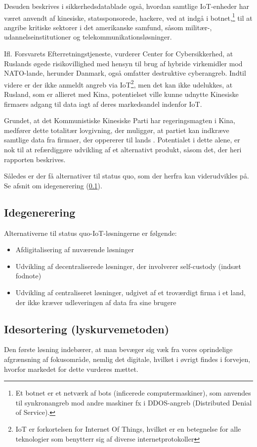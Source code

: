 \documentclass[11pt]{article}
\begin{document}
Desuden beskrives i sikkerhedsdatablade også, hvordan samtlige IoT-enheder har været anvendt af kinesiske, statssponsorede, hackere, ved at indgå i botnet,\footnote{Et botnet er et netværk af bots (inficerede computermaskiner), som anvendes til synkronangreb mod andre maskiner fx i DDOS-angreb (Distributed Denial of Service).} til at angribe kritiske sektorer i det amerikanske samfund, såsom militær-, udannelseinstitutioner og telekommunikationsløsninger. 

Ifl. Forsvarets Efterretningstjeneste, vurderer Center for Cybersikkerhed, at Ruslands øgede risikovillighed med hensyn til brug af hybride virkemidler mod NATO-lande, herunder Danmark, også omfatter destruktive cyberangreb. Indtil videre er der ikke anmeldt angreb via IoT\footnote{IoT er forkortelsen for Internet Of Things, hvilket er en betegnelse for alle teknologier som benytterr sig af diverse internetprotokoller}, men det kan ikke udelukkes, at Rusland, som er allieret med Kina, potentielset ville kunne udnytte Kinesiske firmaers adgang til data iagt af deres markedsandel indenfor IoT.

Grundet, at det Kommunistiske Kinesiske Parti har regeringsmagten i Kina, medfører dette totalitær lovgivning, der muliggør, at partiet kan indkræve samtlige data fra firmaer, der oppererer til lands . Potentialet i dette alene, er nok til at refærdiggøre udvikling af et alternativt produkt, såsom det, der heri rapporten beskrives.

Således er der få alternativer til status quo, som der herfra kan viderudvikles på. Se afsnit om idegenerering (\ref{sec:org12d3e0c}).
\subsection{Idegenerering}
\label{sec:org12d3e0c}
Alternativerne til status quo-IoT-løsningerne er følgende:
\begin{itemize}
\item Afdigitalisering af nuværende løsninger
\item Udvikling af decentraliserede løsninger, der involverer self-custody (indsæt fodnote)
\item Udvikling af centraliseret løsninger, udgivet af et troværdigt firma i et land, der ikke kræver udleveringen af data fra sine brugere
\end{itemize}
\subsection{Idesortering (lyskurvemetoden)}
\label{sec:orgb65406b}
Den første løsning indebærer, at man bevæger sig væk fra vores oprindelige afgrænsning af fokusområde, nemlig det digitale, hvilket i øvrigt findes i forvejen, hvorfor markedet for dette vurderes mættet.
\end{document}
